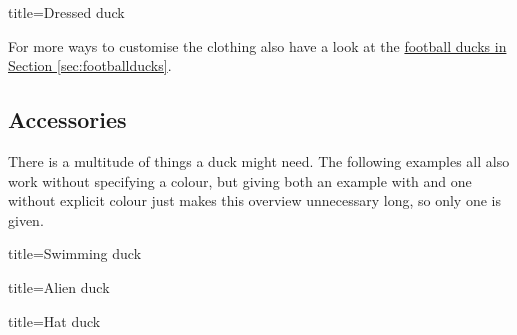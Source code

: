 \documentclass[parskip=half]{scrartcl}
\begin{document}
\begin{tcblisting}{title={Dressed duck}}
\begin{tikzpicture}
	\duck[tshirt]
\end{tikzpicture}
\begin{tikzpicture}
	\duck[jacket]
\end{tikzpicture}

\begin{tikzpicture}
	\duck[tie]
\end{tikzpicture}
\begin{tikzpicture}
	\duck[cape]
\end{tikzpicture}

\begin{tikzpicture}
	\duck[tshirt=lightgray, 
			jacket=blue!50!black, 
			tie=blue!80!black, 
			shorthair]
\end{tikzpicture}
\end{tcblisting}

For more ways to customise the clothing also have a look at the \hyperref[sec:footballducks]{football ducks in Section \ref{sec:footballducks}}.

\subsection{Accessories}
\label{sec:accessories}

There is a multitude of things a duck might need. The following examples all also work without specifying a colour, but giving both an example with and one without explicit colour just makes this overview unnecessary long, so only one is given.

\begin{tcblisting}{title={Swimming duck}}
\begin{tikzpicture}
	\duck[water=cyan!50!blue]
\end{tikzpicture}
\end{tcblisting}

\begin{tcblisting}{title={Alien duck}}
\begin{tikzpicture}
	\duck[alien=green!50!brown]
\end{tikzpicture}
\end{tcblisting}

\begin{tcblisting}{title={Hat duck}}
\begin{tikzpicture}
	\duck[hat=red!50!black]
\end{tikzpicture}
\end{tcblisting}
\end{document}
